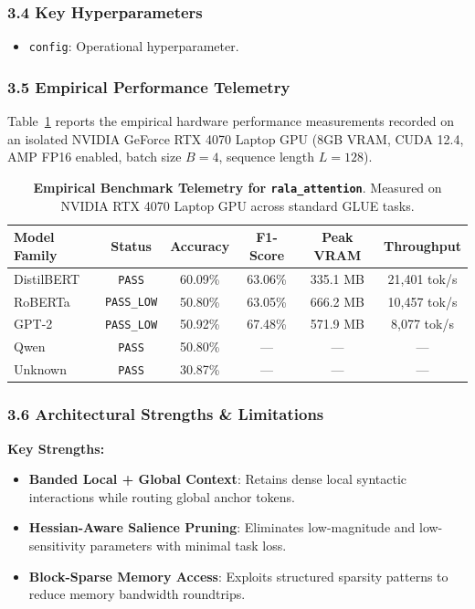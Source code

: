 \subsubsection*{3.4 Key Hyperparameters}
\begin{itemize}
    \item \texttt{config}: Operational hyperparameter.
\end{itemize}

\subsubsection*{3.5 Empirical Performance Telemetry}
Table~\ref{tab:telemetry_rala_attention} reports the empirical hardware performance measurements recorded on an isolated NVIDIA GeForce RTX 4070 Laptop GPU (8GB VRAM, CUDA 12.4, AMP FP16 enabled, batch size $B=4$, sequence length $L=128$).

\begin{table}[h]
\centering
\small
\caption{\textbf{Empirical Benchmark Telemetry for \texttt{rala\_attention}}. Measured on NVIDIA RTX 4070 Laptop GPU across standard GLUE tasks.}
\label{tab:telemetry_rala_attention}
\begin{tabular*}{\columnwidth}{@{\extracolsep{\fill}}lccccc}
\toprule
\textbf{Model Family} & \textbf{Status} & \textbf{Accuracy} & \textbf{F1-Score} & \textbf{Peak VRAM} & \textbf{Throughput} \\
\midrule
DistilBERT & \texttt{PASS} & 60.09\% & 63.06\% & 335.1 MB & 21,401 tok/s \\
RoBERTa & \texttt{PASS\_LOW} & 50.80\% & 63.05\% & 666.2 MB & 10,457 tok/s \\
GPT-2 & \texttt{PASS\_LOW} & 50.92\% & 67.48\% & 571.9 MB & 8,077 tok/s \\
Qwen & \texttt{PASS} & 50.80\% & --- & --- & --- \\
Unknown & \texttt{PASS} & 30.87\% & --- & --- & --- \\
\bottomrule
\end{tabular*}
\end{table}

\subsubsection*{3.6 Architectural Strengths \& Limitations}
\textbf{Key Strengths:}
\begin{itemize}
    \item \textbf{Banded Local + Global Context}: Retains dense local syntactic interactions while routing global anchor tokens.
    \item \textbf{Hessian-Aware Salience Pruning}: Eliminates low-magnitude and low-sensitivity parameters with minimal task loss.
    \item \textbf{Block-Sparse Memory Access}: Exploits structured sparsity patterns to reduce memory bandwidth roundtrips.
\end{itemize}


